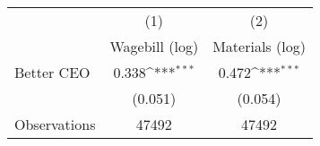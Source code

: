 {
\def\sym#1{\ifmmode^{#1}\else\(^{#1}\)\fi}
\begin{tabular}{l*{2}{c}}
\hline\hline
                    &\multicolumn{1}{c}{(1)}&\multicolumn{1}{c}{(2)}\\
                    &\multicolumn{1}{c}{Wagebill (log)}&\multicolumn{1}{c}{Materials (log)}\\
\hline
Better CEO          &       0.338\sym{***}&       0.472\sym{***}\\
                    &     (0.051)         &     (0.054)         \\
\hline
Observations        &       47492         &       47492         \\
\hline\hline
\end{tabular}
}

